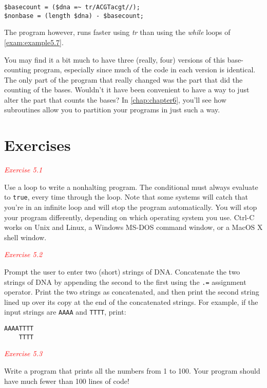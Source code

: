 \begin{lstlisting}
$basecount = ($dna =~ tr/ACGTacgt//);
$nonbase = (length $dna) - $basecount;
\end{lstlisting}

The program however, runs faster using \textit{tr} than using the \textit{while} loops of \autoref{exam:example5.7}.

You may find it a bit much to have three (really, four) versions of this base-counting program, especially since much of the code in each version is identical. The only part of the program that really changed was the part that did the counting of the bases. Wouldn't it have been convenient to have a way to just alter the part that counts the bases? In \autoref{chap:chapter6}, you'll see how subroutines allow you to partition your programs in just such a way. 

\section{Exercises}
\textcolor{red}{\textit{Exercise 5.1}}
\begin{adjustwidth}{2em}{}
Use a loop to write a nonhalting program. The conditional must always evaluate to \verb|true|, every time through the loop. Note that some systems will catch that you're in an infinite loop and will stop the program automatically. You will stop your program differently, depending on which operating system you use. Ctrl-C works on Unix and Linux, a Windows MS-DOS command window, or a MacOS X shell window. 
\end{adjustwidth}

\textcolor{red}{\textit{Exercise 5.2}}
\begin{adjustwidth}{2em}{}
Prompt the user to enter two (short) strings of DNA. Concatenate the two strings of DNA by appending the second to the first using the \verb|.=| assignment operator. Print the two strings as concatenated, and then print the second string lined up over its copy at the end of the concatenated strings. For example, if the input strings are \verb|AAAA| and \verb|TTTT|, print:
\begin{verbatim}
AAAATTTT
    TTTT
\end{verbatim}

\end{adjustwidth}

\textcolor{red}{\textit{Exercise 5.3}}
\begin{adjustwidth}{2em}{}
Write a program that prints all the numbers from 1 to 100. Your program should have much fewer than 100 lines of code! 
\end{adjustwidth}

